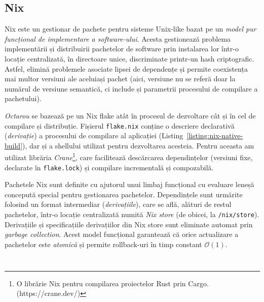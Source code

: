 \documentclass[a4paper]{article}
\begin{document}
\subsection{Nix}
Nix este un gestionar de pachete pentru sisteme Unix-like bazat pe un \textit{model pur funcțional de implementare a software-ului}\cite{edolstra}.
Acesta gestionează problema implementării și distribuirii pachetelor de software prin instalarea lor într-o locație centralizată, în directoare
unice, discriminate printr-un hash criptografic. Astfel, elimină problemele asociate lipsei de dependențe și permite coexistența mai multor
versiuni ale aceluiași pachet (aici, versiune nu se referă doar la numărul de versiune semantică, ci include și parametrii procesului de compilare
a pachetului).

\textit{Octarou} se bazează pe un Nix flake atât în procesul de dezvoltare cât și în cel de compilare și distribuție. Fișierul \texttt{flake.nix} conține
o descriere declarativă (\textit{derivație}) a procesului de compilare al aplicației (Listing~\ref{listing:nix-native-build}), dar și a shellului utilizat
pentru dezvoltarea acesteia. Pentru aceasta am
utilizat librăria \textit{Crane}\footnote[1]{O librărie Nix pentru compilarea proiectelor Rust prin Cargo. (https://crane.dev/)}, care facilitează
descărcarea dependințelor (versiuni fixe, declarate în \texttt{flake.lock}) și compilare incrementală și compozabilă.

Pachetele Nix sunt definite cu ajutorul unui limbaj funcțional cu evaluare leneșă concepută special pentru gestionarea pachetelor. Dependințele
sunt urmărite folosind un format intermediar (\textit{derivațiile}), care se află, alături de restul pachetelor, într-o locație centralizată numită
\textit{Nix store} (de obicei, la \texttt{/nix/store}). Derivațiile și specificațiile derivațiilor din Nix store sunt eliminate automat prin
\textit{garbage collection}. Acest model funcțional garantează că orice actualizare a pachetelor este \textit{atomică} și permite rollback-uri
în timp constant\cite{edolstra} $\mathcal{O}(1)$.

\begin{listing}
	\inputminted{nix}{codeblocks/package.nix}
	\caption{Derivația procesului de compilare pe platforma nativă}
	\label{listing:nix-native-build}
\end{listing}

\begin{listing}
	\inputminted{nix}{codeblocks/paper.nix}
	\caption{Derivația acestui document \LaTeX}
	\label{listing:this-paper}
\end{listing}
\end{document}
